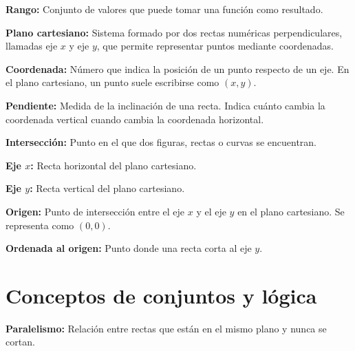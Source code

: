 \documentclass[12pt,final]{report}
\theoremstyle{plain}
\theoremstyle{definition}
\begin{document}
\textbf{Rango:} Conjunto de valores que puede tomar una función como resultado.

\vspace{0.5em}

\textbf{Plano cartesiano:} Sistema formado por dos rectas numéricas perpendiculares, llamadas eje $x$ y eje $y$, que permite representar puntos mediante coordenadas.

\vspace{0.5em}

\textbf{Coordenada:} Número que indica la posición de un punto respecto de un eje. En el plano cartesiano, un punto suele escribirse como $(x,y)$.

\vspace{0.5em}

\textbf{Pendiente:} Medida de la inclinación de una recta. Indica cuánto cambia la coordenada vertical cuando cambia la coordenada horizontal.

\vspace{0.5em}

\textbf{Intersección:} Punto en el que dos figuras, rectas o curvas se encuentran.

\vspace{0.5em}

\textbf{Eje $x$:} Recta horizontal del plano cartesiano.

\vspace{0.5em}

\textbf{Eje $y$:} Recta vertical del plano cartesiano.

\vspace{0.5em}

\textbf{Origen:} Punto de intersección entre el eje $x$ y el eje $y$ en el plano cartesiano. Se representa como $(0,0)$.

\vspace{0.5em}

\textbf{Ordenada al origen:} Punto donde una recta corta al eje $y$.

\section*{Conceptos de conjuntos y lógica}

\vspace{0.5em}

\textbf{Paralelismo:} Relación entre rectas que están en el mismo plano y nunca se cortan.

\vspace{0.5em}
\end{document}
